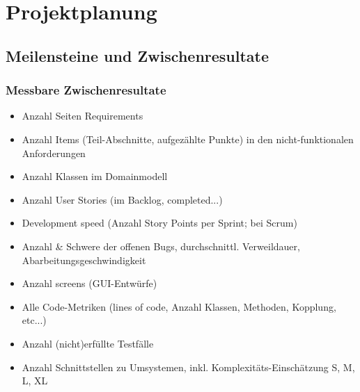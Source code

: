 


\newcommand{\SUBJECT}{Zusammenfassung}
\newcommand{\TITLE}{Software Engineering 2}




\section{Projektplanung}

\subsection{Meilensteine und Zwischenresultate}

\subsubsection{Messbare Zwischenresultate}

\begin{itemize}
\item Anzahl Seiten Requirements
\item Anzahl Items (Teil-Abschnitte, aufgezählte Punkte) in den nicht-funktionalen Anforderungen
\item Anzahl Klassen im Domainmodell
\item Anzahl User Stories (im Backlog, completed...)
\item Development speed (Anzahl Story Points per Sprint; bei Scrum)
\item Anzahl \& Schwere der offenen Bugs, durchschnittl. Verweildauer, Abarbeitungsgeschwindigkeit
\item Anzahl screens (GUI-Entwürfe)
\item Alle Code-Metriken (lines of code, Anzahl Klassen, Methoden, Kopplung, etc...)
\item Anzahl (nicht)erfüllte Testfälle
\item Anzahl Schnittstellen zu Umsystemen, inkl. Komplexitäts-Einschätzung S, M, L, XL
\end{itemize}
